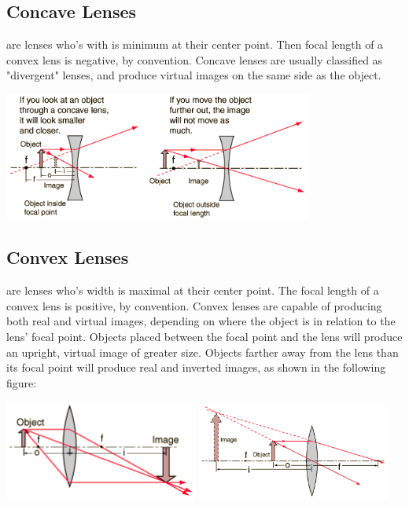 \documentclass{amsart}
\begin{document}
\medskip
\subsection{Concave Lenses \nopunct} are lenses who's with is minimum at their center point. Then focal length of a convex lens is negative, by convention. Concave lenses are usually classified as "divergent" lenses, and produce virtual images on the same side as the object.
\begin{center}
\includegraphics[width = 4in]{ccv.png}
\end{center}

\subsection{Convex Lenses \nopunct} are lenses who's width is maximal at their center point. The focal length of a convex lens is positive, by convention. Convex lenses are capable of producing both real and virtual images, depending on where the object is in relation to the lens' focal point. Objects placed between the focal point and the lens will produce an upright, virtual image of greater size. Objects farther away from the lens than its focal point will produce real and inverted images, as shown in the following figure:
\begin{center}
\includegraphics[width = 2.5in]{cvex1.png}
\includegraphics[width = 2.5in]{cvex2.png}
\end{center}
\end{document}
